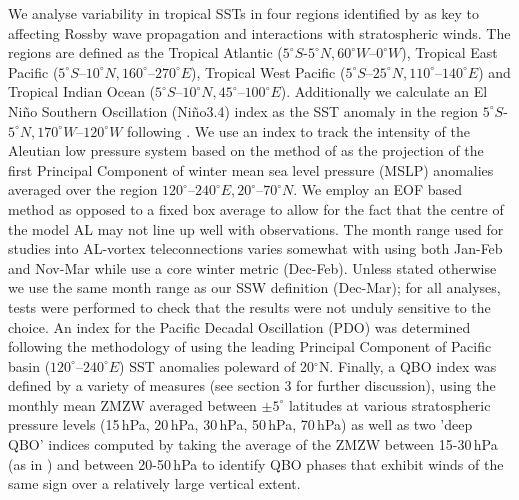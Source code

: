 We analyse variability in tropical SSTs in four regions identified by \cite{scaifeTropical2017b} as key to affecting Rossby wave propagation and interactions with stratospheric winds. The regions are defined as the Tropical Atlantic ($5^{\circ}S$-$5^{\circ}N, 60^{\circ}W$–$0^{\circ}W$), Tropical East Pacific ($5^{\circ}S$–$10^{\circ}N, 160^{\circ}$–$270^{\circ}E$), Tropical West Pacific ($5^{\circ}S$–$25^{\circ}N, 110^{\circ}$–$140^{\circ}E$) and Tropical Indian Ocean ($5^{\circ}S$–$10^{\circ}N, 45^{\circ}$–$100^{\circ}E$). Additionally we calculate an El Ni\~{n}o Southern Oscillation (Ni\~{n}o3.4) index as the SST anomaly in the region $5^{\circ}S$-$5^{\circ}N, 170^{\circ}W$–$120^{\circ}W$ following \cite{trenberthIndices2001a}. We use an index to track the intensity of the Aleutian low pressure system based on the method of \cite{chenPotential2020b} as the projection of the first Principal Component of winter mean sea level pressure (MSLP) anomalies averaged over the region $120^{\circ}$–$240^{\circ}E, 20^{\circ}$–$70^{\circ}N$. We employ an EOF based method as opposed to a fixed box average to allow for the fact that the centre of the model AL may not line up well with observations. The month range used for studies into AL-vortex teleconnections varies somewhat with \cite{overlandDecadal1999b} using both Jan-Feb and Nov-Mar while \cite{huDecadal2018b} use a core winter metric (Dec-Feb). Unless stated otherwise we use the same month range as our SSW definition (Dec-Mar); for all analyses, tests were performed to check that the results were not unduly sensitive to the choice. An index for the Pacific Decadal Oscillation (PDO) was determined following the methodology of \cite{mantuaPacific1997a} using the leading Principal Component of Pacific basin ($120^{\circ}$–$240^{\circ}E$) SST anomalies poleward of 20$^{\circ}$N. Finally, a QBO index was defined by a variety of measures (see section 3 for further discussion), using the monthly mean ZMZW averaged between $\pm5^{\circ}$ latitudes at various stratospheric pressure levels (15\,hPa, 20\,hPa, 30\,hPa, 50\,hPa, 70\,hPa) as well as two 'deep QBO' indices computed  by taking the average of the ZMZW between  15-30\,hPa (as in \cite{andrewsObserved2019d}) and between 20-50\,hPa to identify QBO phases that exhibit winds of the same sign over a relatively large vertical extent. 

